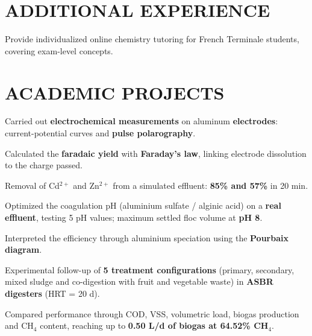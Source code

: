 \documentclass[10pt]{article}
\begin{document}
\section{ADDITIONAL EXPERIENCE}
\begin{bul}
\item Provide individualized online chemistry tutoring for French Terminale students, covering exam-level concepts.
\end{bul}

\section{ACADEMIC PROJECTS}
\begin{bul}
\item Carried out \textbf{electrochemical measurements} on aluminum \textbf{electrodes}: current-potential curves and \textbf{pulse polarography}.
\item Calculated the \textbf{faradaic yield} with \textbf{Faraday's law}, linking electrode dissolution to the charge passed.
\item Removal of Cd$^{2+}$ and Zn$^{2+}$ from a simulated effluent: \textbf{85\% and 57\%} in 20 min.
\end{bul}
\begin{bul}
\item Optimized the coagulation pH (aluminium sulfate / alginic acid) on a \textbf{real effluent}, testing 5 pH values; maximum settled floc volume at \textbf{pH 8}.
\item Interpreted the efficiency through aluminium speciation using the \textbf{Pourbaix diagram}.
\end{bul}
\begin{bul}
\item Experimental follow-up of \textbf{5 treatment configurations} (primary, secondary, mixed sludge and co-digestion with fruit and vegetable waste) in \textbf{ASBR digesters} (HRT = 20 d).
\item Compared performance through COD, VSS, volumetric load, biogas production and CH$_4$ content, reaching up to \textbf{0.50 L/d of biogas at 64.52\% CH$_4$}.
\end{bul}
\end{document}
